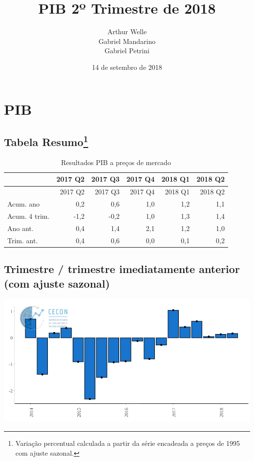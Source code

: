 \documentclass[11pt,portuguese,]{article}
\title{PIB 2º Trimestre de 2018}
\author{Arthur Welle \\ Gabriel Mandarino \\ Gabriel Petrini}
\date{14 de setembro de 2018}
\let\rmarkdownfootnote\footnote%
\def\footnote{\protect\rmarkdownfootnote}
\begin{document}
\maketitle

\section{PIB}\label{pib}

\subsection[Tabela Resumo]{\texorpdfstring{Tabela Resumo\footnote{Variação
  percentual calculada a partir da série encadeada a preços de 1995 com
  ajuste sazonal.}}{Tabela Resumo}}\label{tabela-resumo1}

\begin{longtable}[]{@{}lrrrrr@{}}
\caption{Resultados PIB a preços de mercado}\tabularnewline
\toprule
& 2017 Q2 & 2017 Q3 & 2017 Q4 & 2018 Q1 & 2018 Q2\tabularnewline
\midrule
\endfirsthead
\toprule
& 2017 Q2 & 2017 Q3 & 2017 Q4 & 2018 Q1 & 2018 Q2\tabularnewline
\midrule
\endhead
Acum. ano & 0,2 & 0,6 & 1,0 & 1,2 & 1,1\tabularnewline
Acum. 4 trim. & -1,2 & -0,2 & 1,0 & 1,3 & 1,4\tabularnewline
Ano ant. & 0,4 & 1,4 & 2,1 & 1,2 & 1,0\tabularnewline
Trim. ant. & 0,4 & 0,6 & 0,0 & 0,1 & 0,2\tabularnewline
\bottomrule
\end{longtable}

\subsection{Trimestre / trimestre imediatamente anterior (com ajuste
sazonal)}\label{trimestre-trimestre-imediatamente-anterior-com-ajuste-sazonal}

\begin{center}\includegraphics[width=1\linewidth]{Grafico_PIB} \end{center}
\end{document}
